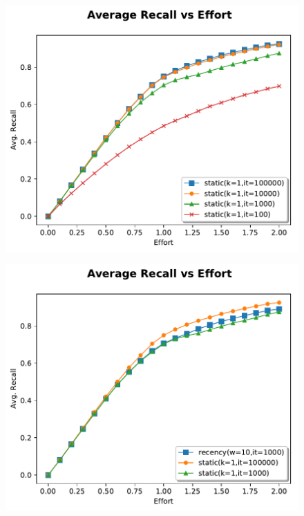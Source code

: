 \documentclass{beamer}
\begin{document}
\begin{frame}
\begin{figure}
 \centering 
 \includegraphics[width=1.0\textwidth]{train1.pdf}
\end{figure}
\end{frame}

\begin{frame}
\begin{figure}
 \centering 
 \includegraphics[width=1.0\textwidth]{rec1.pdf}
\end{figure}
\end{frame}
\end{document}
